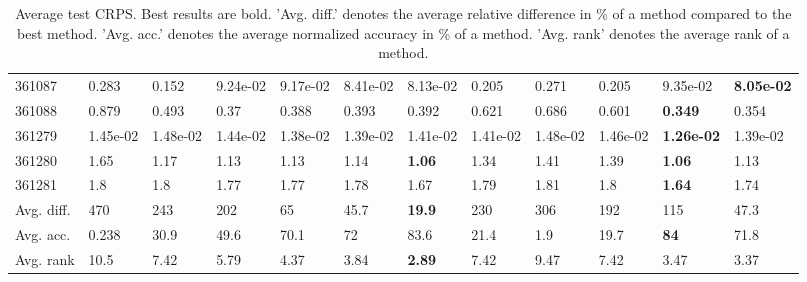 \begin{table}[ht!]
\begin{tabular}{llllllllllll}
  361087 & 0.283 & 0.152 & 9.24e-02 & 9.17e-02 & 8.41e-02 & 8.13e-02 & 0.205 & 0.271 & 0.205 & 9.35e-02 & \textbf{8.05e-02} \\ 
  361088 & 0.879 & 0.493 & 0.37 & 0.388 & 0.393 & 0.392 & 0.621 & 0.686 & 0.601 & \textbf{0.349} & 0.354 \\ 
  361279 & 1.45e-02 & 1.48e-02 & 1.44e-02 & 1.38e-02 & 1.39e-02 & 1.41e-02 & 1.41e-02 & 1.48e-02 & 1.46e-02 & \textbf{1.26e-02} & 1.39e-02 \\ 
  361280 & 1.65 & 1.17 & 1.13 & 1.13 & 1.14 & \textbf{1.06} & 1.34 & 1.41 & 1.39 & \textbf{1.06} & 1.13 \\ 
  361281 & 1.8 & 1.8 & 1.77 & 1.77 & 1.78 & 1.67 & 1.79 & 1.81 & 1.8 & \textbf{1.64} & 1.74 \\ 
   \hline
Avg. diff. & 470 & 243 & 202 & 65 & 45.7 & \textbf{19.9} & 230 & 306 & 192 & 115 & 47.3 \\ 
  Avg. acc. & 0.238 & 30.9 & 49.6 & 70.1 & 72 & 83.6 & 21.4 & 1.9 & 19.7 & \textbf{84} & 71.8 \\ 
  Avg. rank & 10.5 & 7.42 & 5.79 & 4.37 & 3.84 & \textbf{2.89} & 7.42 & 9.47 & 7.42 & 3.47 & 3.37 \\ 
   \hline
\hline
\end{tabular}
\endgroup
\caption{Average test CRPS. 
                  Best results are bold. 
                  'Avg. diff.' denotes the average relative difference in \% of a method compared to the best method.
                  'Avg. acc.' denotes the average normalized accuracy in \% of a method.
                  'Avg. rank' denotes the average rank of a method.} 
\label{TABLES/table_results_CRPS_umap}
\end{table}
